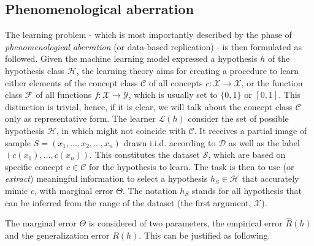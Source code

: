 \subsection{Phenomenological aberration}

The learning problem - which is most importantly described by the phase of \textit{phenomenological aberration} (or data-based replication) - is then formulated as followed. Given the machine learning model expressed a hypothesis $h$ of the hypothesis class $\mathcal{H}$, the learning theory aims for creating a procedure to learn either elements of the concept class $\mathcal{C}$ of all concepts $c: \mathcal{X}\to \mathcal{X}$, or the function class $\mathcal{F}$ of all functions $f: \mathcal{X}\to \mathcal{Y}$, which is usually set to $\{0,1\}$ or $[0,1]$. This distinction is trivial, hence, if it is clear, we will talk about the concept class $\mathcal{C}$ only as representative form. The learner $\mathcal{L}(h)$ consider the set of possible hypothesis $\mathcal{H}$, in which might not coincide with $\mathcal{C}$. It receives a partial image of sample $S=(x_{1},\dots,x_{2},\dots,x_n)$ drawn i.i.d. according to $\mathcal{D}$ as well as the label $(c(x_1),\dots,c(x_n))$. This constitutes the dataset $\mathcal{S}$, which are based on specific concept $c\in \mathcal{C}$ for the hypothesis to learn. The task is then to use (or \textit{extract}) meaningful information to select a hypothesis $h_{S}\in \mathcal{H}$ that accurately mimic $c$, with marginal error $\Theta$. The notation $h_{S}$ stands for all hypothesis that can be inferred from the range of the dataset (the first argument, $\mathcal{X}$). 

The marginal error $\Theta$ is considered of two parameters, the empirical error $\hat{R}(h)$ and the generalization error $R(h)$. This can be justified as following. 

